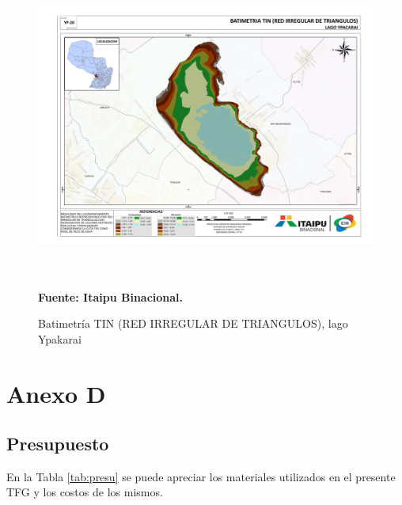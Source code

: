 \begin{appendices}
\begin{figure}[ht]
    \centering
    \includegraphics[width=150mm, height=100mm]{Imagenes/cap3/Batimetria_lago_Ypacarai_TIN_A3.pdf}
    \caption[BATIMETRIA TIN lago Ypakarai]{Batimetr\'ia TIN (RED IRREGULAR DE TRIANGULOS), lago Ypakarai} \textbf{Fuente: Itaipu Binacional.}
    \label{fig:ModuloFrontal}
\end{figure}


\chapter*{Anexo D}
\label{appendix: d}
\section[Presupuesto]{Presupuesto}
En la Tabla \ref{tab:presu} se puede apreciar los materiales utilizados en el presente TFG y los costos de los mismos.


\end{appendices}
